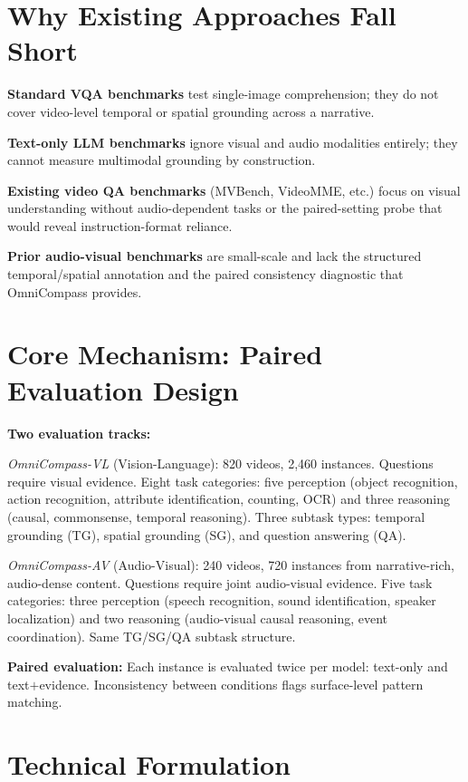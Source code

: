 \documentclass[10pt,twocolumn]{article}
\begin{document}
\section{Why Existing Approaches Fall Short}

\textbf{Standard VQA benchmarks} test single-image comprehension; they
do not cover video-level temporal or spatial grounding across a narrative.

\textbf{Text-only LLM benchmarks} ignore visual and audio modalities
entirely; they cannot measure multimodal grounding by construction.

\textbf{Existing video QA benchmarks} (MVBench, VideoMME, etc.) focus on
visual understanding without audio-dependent tasks or the paired-setting
probe that would reveal instruction-format reliance.

\textbf{Prior audio-visual benchmarks} are small-scale and lack the
structured temporal/spatial annotation and the paired consistency
diagnostic that OmniCompass provides.

\section{Core Mechanism: Paired Evaluation Design}

\textbf{Two evaluation tracks:}

\emph{OmniCompass-VL} (Vision-Language): 820 videos, 2{,}460 instances.
Questions require visual evidence. Eight task categories: five perception
(object recognition, action recognition, attribute identification,
counting, OCR) and three reasoning (causal, commonsense, temporal
reasoning). Three subtask types: temporal grounding (TG), spatial
grounding (SG), and question answering (QA).

\emph{OmniCompass-AV} (Audio-Visual): 240 videos, 720 instances from
narrative-rich, audio-dense content. Questions require joint audio-visual
evidence. Five task categories: three perception (speech recognition,
sound identification, speaker localization) and two reasoning
(audio-visual causal reasoning, event coordination). Same TG/SG/QA
subtask structure.

\textbf{Paired evaluation:} Each instance is evaluated twice per model:
text-only and text$+$evidence. Inconsistency between conditions flags
surface-level pattern matching.

\section{Technical Formulation}
\end{document}
